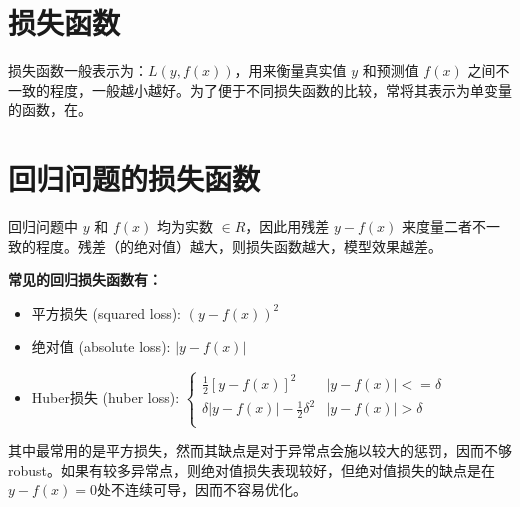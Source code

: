 \documentclass[12pt]{article}
\begin{document}

\section{损失函数\cite{Compare_Loss_Func_Between_Regression_Classification}}
损失函数一般表示为：$L(y,f(x))$，用来衡量真实值 $y$ 和预测值 $f(x)$ 之间不一致的程度，一般越小越好。为了便于不同损失函数的比较，常将其表示为单变量的函数，在{\color{red}{回归问题中，这个变量为 $y-f(x)$， 在分类问题中，这个变量为 $yf(x)$}}。

\section{回归问题的损失函数}
回归问题中 $y$ 和 $f(x)$ 均为实数 $\in R$，因此用残差 $y-f(x)$ 来度量二者不一致的程度。残差（的绝对值）越大，则损失函数越大，模型效果越差。

\textbf{常见的回归损失函数有：}
\begin{itemize}[itemindent=2em]
    \item 平方损失 (squared loss): $(y-f(x))^2$
    
    \item 绝对值 (absolute loss): $|y-f(x)|$
    
    \item Huber损失 (huber loss): 
    $\begin{cases}
\frac{1}{2}[y-f(x)]^2 & |y-f(x)| <= \delta\\
\delta|y-f(x)|-\frac{1}{2}\delta^2 & |y-f(x)| > \delta\\
\end{cases}$
\end{itemize}

其中最常用的是平方损失，然而其缺点是对于异常点会施以较大的惩罚，因而不够robust。如果有较多异常点，则绝对值损失表现较好，但绝对值损失的缺点是在$y-f(x)=0$处不连续可导，因而不容易优化。
\end{document}
